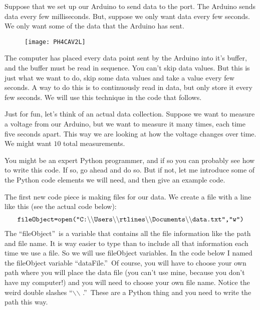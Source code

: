 Suppose that we set up our Arduino to send data to the port. The Arduino
sends data every few milliseconds. But, suppose we only want data every few
seconds. We only want some of the data that the Arduino has sent. \begin{figure}[h!]
\texttt{[image: PH4CAV2L]}
\end{figure}%
The computer has placed every data point sent by the Arduino into it's
buffer, and the buffer must be read in sequence. You can't skip data values.
But this is just what we want to do, skip some data values and take a value
every few seconds. A way to do this is to continuously read in data, but
only store it every few seconds. We will use this technique in the code that
follows.

Just for fun, let's think of an actual data collection. Suppose we want to
measure a voltage from our Arduino, but we want to measure it many times,
each time five seconds apart. This way we are looking at how the voltage
changes over time. We might want $10$ total measurements.

You might be an expert Python programmer, and if so you can probably see how
to write this code. If so, go ahead and do so. But if not, let me introduce
some of the Python code elements we will need, and then give an example code.

The first new code piece is making files for our data. We create a file with
a line like this (see the actual code below):%
\begin{equation*}
\begin{tabular}{l}
\texttt{fileObject=open("C:$\backslash$$\backslash$%
Users$\backslash$$\backslash$rtlines$\backslash$$\backslash$Documents$\backslash$%
$\backslash$data.txt","w")}%
\end{tabular}%
\end{equation*}%
The \textquotedblleft fileObject\textquotedblright\ is a variable that
contains all the file information like the path and file name. It is way
easier to type than to include all that information each time we use a file.
So we will use fileObject variables. In the code below I named the
fileObject variable \textquotedblleft dataFile.\textquotedblright\ Of
course, you will have to choose your own path where you will place the data
file (you can't use mine, because you don't have my computer!) and you will
need to choose your own file name. Notice the weird double slashes
\textquotedblleft $\backslash$$\backslash$%
.\textquotedblright\ These are a Python thing and you need to write the path
this way.


